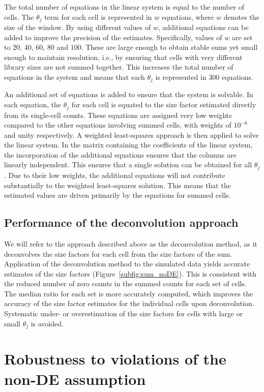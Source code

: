 \documentclass{article}
\begin{document}
The total number of equations in the linear system is equal to the number of cells.
The $\theta_j$ term for each cell is represented in $w$ equations, where $w$ denotes the size of the window.
By using different values of $w$, additional equations can be added to improve the precision of the estimates. 
Specifically, values of $w$ are set to 20, 40, 60, 80 and 100.
These are large enough to obtain stable sums yet small enough to maintain resolution, i.e., by ensuring that cells with very different library sizes are not summed together.
This increases the total number of equations in the system and means that each $\theta_j$ is represented in 300 equations. 

An additional set of equations is added to ensure that the system is solvable.
In each equation, the $\theta_j$ for each cell is equated to the size factor estimated directly from its single-cell counts.
These equations are assigned very low weights compared to the other equations involving summed cells, with weights of $10^{-6}$ and unity respectively.
A weighted least-squares approach is then applied to solve the linear system.
In the matrix containing the coefficients of the linear system, the incorporation of the additional equations ensures that the columns are linearly independent.
This ensures that a single solution can be obtained for all $\theta_j$.
Due to their low weights, the additional equations will not contribute substantially to the weighted least-squares solution.
This means that the estimated values are driven primarily by the equations for summed cells.

\subsection{Performance of the deconvolution approach}
We will refer to the approach described above as the deconvolution method, as it deconvolves the size factors for each cell from the size factors of the sum.
Application of the deconvolution method to the simulated data yields accurate estimates of the size factors (Figure~\ref{subfig:sum_noDE}).
This is consistent with the reduced number of zero counts in the summed counts for each set of cells.
The median ratio for each set is more accurately computed, which improves the accuracy of the size factor estimates for the individual cells upon deconvolution.
Systematic under- or overestimation of the size factors for cells with large or small $\theta_j$ is avoided.

\section{Robustness to violations of the non-DE assumption}
\end{document}
